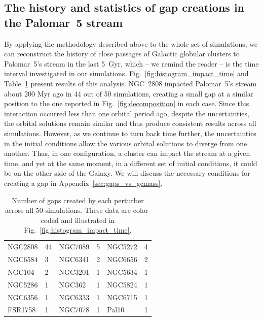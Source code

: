    \subsection{The history and statistics of gap creations in the Palomar~5 stream}\label{sect:history}
        By applying the methodology described above to the whole set of simulations, we can reconstruct the history of close passages of Galactic globular clusters to Palomar~5's stream in the last 5~Gyr, which -- we remind the reader -- is the time interval investigated in our simulations.  Fig.~\ref{fig:histogram_impact_time} and Table~\ref{tab:gaps_per_perturber} present results of this analysis. NGC~2808 impacted Palomar~5's stream about 200 Myr ago in 44 out of 50 simulations, creating a small gap at a similar position to the one reported in Fig.~\ref{fig:decomposition} in each case. Since this interaction occurred less than one orbital period ago, despite the uncertainties, the orbital solutions remain similar and thus produce consistent results across all simulations. However, as we continue to turn back time further, the uncertainties in the initial conditions allow the various orbital solutions to diverge from one another. Thus, in one configuration, a cluster can impact the stream at a given time, and yet at the same moment, in a different set of initial conditions, it could be on the other side of the Galaxy. We will discuss the necessary conditions for creating a gap in Appendix~\ref{sec:gaps_vs_gcmass}. 
        \begin{table}[h]
            \centering
            \caption{Number of gaps created by each perturber across all 50 simulations. These data are color-coded and illustrated in Fig.~\ref{fig:histogram_impact_time}.}
            \label{tab:gaps_per_perturber}
            \begin{tabular}{|ll|ll|ll|}
            \hline
            NGC2808 & 44 & NGC7089 & 5 & NGC5272 & 4 \\
            NGC6584 & 3 & NGC6341 & 2 & NGC6656 & 2 \\
            NGC104 & 2 & NGC3201 & 1 & NGC5634 & 1 \\
            NGC5286 & 1 & NGC362 & 1 & NGC5824 & 1 \\
            NGC6356 & 1 & NGC6333 & 1 & NGC6715 & 1 \\
            FSR1758 & 1 & NGC7078 & 1 & Pal10 & 1 \\
            \hline
            \end{tabular}
        \end{table} 

